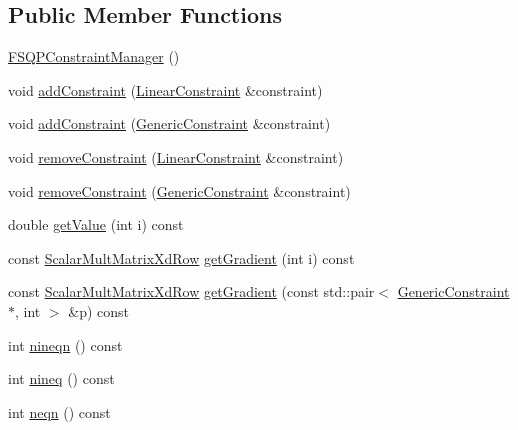 \subsection*{Public Member Functions}
\begin{DoxyCompactItemize}
\item 
\hyperlink{classocra_1_1FSQPConstraintManager_adce56c9faf54d60f6a2a01db9db36310}{F\+S\+Q\+P\+Constraint\+Manager} ()
\item 
void \hyperlink{classocra_1_1FSQPConstraintManager_a17e4f4d67bd1cda3e88003e3409ea747}{add\+Constraint} (\hyperlink{namespaceocra_ae8b87cf4099be3efc3b410019ad2046e}{Linear\+Constraint} \&constraint)
\item 
void \hyperlink{classocra_1_1FSQPConstraintManager_ad85f524f15572eb08e324024c293d46c}{add\+Constraint} (\hyperlink{namespaceocra_af10341108ce661566aad00908668e2b1}{Generic\+Constraint} \&constraint)
\item 
void \hyperlink{classocra_1_1FSQPConstraintManager_ad32235da282d8a388d350410534877e0}{remove\+Constraint} (\hyperlink{namespaceocra_ae8b87cf4099be3efc3b410019ad2046e}{Linear\+Constraint} \&constraint)
\item 
void \hyperlink{classocra_1_1FSQPConstraintManager_a5632e44ca4824c5d07d40a942623397b}{remove\+Constraint} (\hyperlink{namespaceocra_af10341108ce661566aad00908668e2b1}{Generic\+Constraint} \&constraint)
\item 
double \hyperlink{classocra_1_1FSQPConstraintManager_a9c69a25d5d3980d98ffbad6d9174a605}{get\+Value} (int i) const
\item 
const \hyperlink{classocra_1_1FSQPConstraintManager_abe1cf7412d42b4a1b7158936a24ae6fb}{Scalar\+Mult\+Matrix\+Xd\+Row} \hyperlink{classocra_1_1FSQPConstraintManager_ac8d03a1dc767bba113bee013dd6e79b6}{get\+Gradient} (int i) const
\item 
const \hyperlink{classocra_1_1FSQPConstraintManager_abe1cf7412d42b4a1b7158936a24ae6fb}{Scalar\+Mult\+Matrix\+Xd\+Row} \hyperlink{classocra_1_1FSQPConstraintManager_a87f72691e71e37524c2e834192874da1}{get\+Gradient} (const std\+::pair$<$ \hyperlink{namespaceocra_af10341108ce661566aad00908668e2b1}{Generic\+Constraint} $\ast$, int $>$ \&p) const
\item 
int \hyperlink{classocra_1_1FSQPConstraintManager_a0e045890da8fece584fef4a5f72d90ad}{nineqn} () const
\item 
int \hyperlink{classocra_1_1FSQPConstraintManager_a83034f5a9b248cd6079f926038c14708}{nineq} () const
\item 
int \hyperlink{classocra_1_1FSQPConstraintManager_a926e1a8a27fe1fcfe17cc0c79617f736}{neqn} () const

\end{DoxyCompactItemize}
